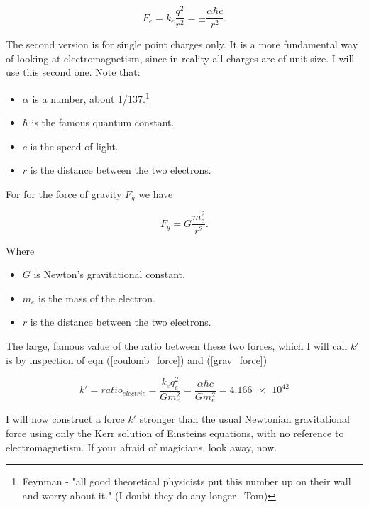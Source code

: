 \documentclass[../rzero]{subfiles}
\begin{document}
\begin{equation}\label{coulomb_force}
	F_e = k_e\frac{q^2}{r^2} = \pm \frac{\alpha \hbar c}{r^2}.
\end{equation}

The second version is for single point charges only. It is a more fundamental way of looking at electromagnetism, since in reality all charges are of unit size. I will use this second one. Note that:

\begin{itemize}
  \item $\alpha$ is a number, about 1/137.\footnote{Feynman - "all good theoretical physicists put this number up on their wall and worry about it."\cite{Feynman1985} (I doubt they do any longer --Tom) }
  \item $\hbar$ is the famous quantum constant.
  \item $c$ is the speed of light.
  \item $r$ is the distance between the two electrons.
\end{itemize}

For for the force of gravity $F_g$ we have

\begin{equation} \label{grav_force}
	F_g = G\frac{m_e^2}{r^2}.
\end{equation}

Where

\begin{itemize}
  \item $G$ is Newton's gravitational constant.
  \item $m_e$ is the mass of the electron.
  \item $r$ is the distance between the two electrons.
\end{itemize}

The large, famous value of the ratio between these two forces, which I will call $k'$ is by inspection of eqn (\ref{coulomb_force}) and (\ref{grav_force})

\begin{equation} \label{electric_ratio}
	k' = ratio_{electric} = \frac{k_e q_e^2}{G m_e^2} = \frac{\alpha \hbar c}{G m_e^2} = \num{4.166e42}
\end{equation}


I will now construct a force $k'$ stronger than the usual Newtonian gravitational force using only the Kerr solution of Einsteins equations, with no reference to electromagnetism. If your afraid of magicians, look away, now.
\end{document}
